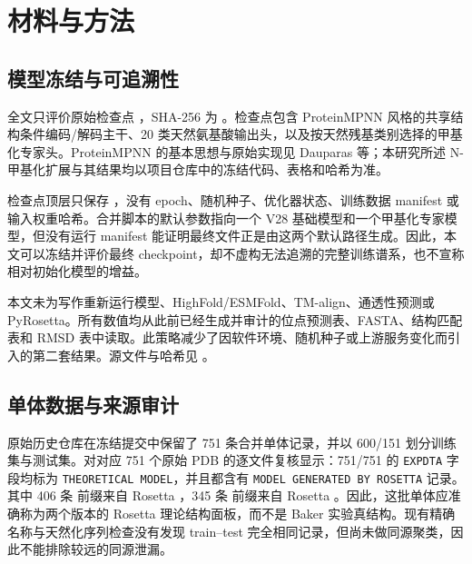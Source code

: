 \section{材料与方法}

\subsection{模型冻结与可追溯性}

全文只评价原始检查点 ，SHA-256 为 \checkpointsha。检查点包含 ProteinMPNN 风格的共享结构条件编码/解码主干、20 类天然氨基酸输出头，以及按天然残基类别选择的甲基化专家头。ProteinMPNN 的基本思想与原始实现见 Dauparas 等\cite{dauparas2022proteinmpnn}；本研究所述 N-甲基化扩展与其结果均以项目仓库中的冻结代码、表格和哈希为准。

检查点顶层只保存 ，没有 epoch、随机种子、优化器状态、训练数据 manifest 或输入权重哈希。合并脚本的默认参数指向一个 V28 基础模型和一个甲基化专家模型，但没有运行 manifest 能证明最终文件正是由这两个默认路径生成。因此，本文可以冻结并评价最终 checkpoint，却不虚构无法追溯的完整训练谱系，也不宣称相对初始化模型的增益。

本文未为写作重新运行模型、HighFold/ESMFold、TM-align、通透性预测或 PyRosetta。所有数值均从此前已经生成并审计的位点预测表、FASTA、结构匹配表和 RMSD 表中读取。此策略减少了因软件环境、随机种子或上游服务变化而引入的第二套结果。源文件与哈希见 。

\subsection{单体数据与来源审计}

原始历史仓库在冻结提交中保留了 751 条合并单体记录，并以 600/151 划分训练集与测试集。对对应 751 个原始 PDB 的逐文件复核显示：751/751 的 \texttt{EXPDTA} 字段均标为 \texttt{THEORETICAL MODEL}，并且都含有 \texttt{MODEL GENERATED BY ROSETTA} 记录。其中 406 条  前缀来自 Rosetta ，345 条  前缀来自 Rosetta 。因此，这批单体应准确称为两个版本的 Rosetta 理论结构面板，而不是 Baker 实验真结构。现有精确名称与天然化序列检查没有发现 train--test 完全相同记录，但尚未做同源聚类，因此不能排除较远的同源泄漏。

